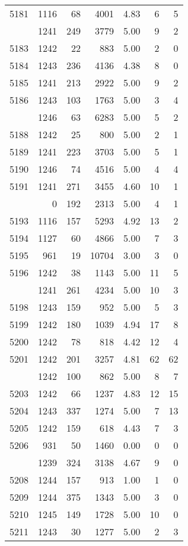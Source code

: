 \documentclass[
]{article}
\begin{document}
\begin{table}
\begin{tabular}[t]{lrrrrrr}
5181 & 1116 & 68 & 4001 & 4.83 & 6 & 5\\
\addlinespace
5182 & 1241 & 249 & 3779 & 5.00 & 9 & 2\\
5183 & 1242 & 22 & 883 & 5.00 & 2 & 0\\
5184 & 1243 & 236 & 4136 & 4.38 & 8 & 0\\
5185 & 1241 & 213 & 2922 & 5.00 & 9 & 2\\
5186 & 1243 & 103 & 1763 & 5.00 & 3 & 4\\
\addlinespace
5187 & 1246 & 63 & 6283 & 5.00 & 5 & 2\\
5188 & 1242 & 25 & 800 & 5.00 & 2 & 1\\
5189 & 1241 & 223 & 3703 & 5.00 & 5 & 1\\
5190 & 1246 & 74 & 4516 & 5.00 & 4 & 4\\
5191 & 1241 & 271 & 3455 & 4.60 & 10 & 1\\
\addlinespace
5192 & 0 & 192 & 2313 & 5.00 & 4 & 1\\
5193 & 1116 & 157 & 5293 & 4.92 & 13 & 2\\
5194 & 1127 & 60 & 4866 & 5.00 & 7 & 3\\
5195 & 961 & 19 & 10704 & 3.00 & 3 & 0\\
5196 & 1242 & 38 & 1143 & 5.00 & 11 & 5\\
\addlinespace
5197 & 1241 & 261 & 4234 & 5.00 & 10 & 3\\
5198 & 1243 & 159 & 952 & 5.00 & 5 & 3\\
5199 & 1242 & 180 & 1039 & 4.94 & 17 & 8\\
5200 & 1242 & 78 & 818 & 4.42 & 12 & 4\\
5201 & 1242 & 201 & 3257 & 4.81 & 62 & 62\\
\addlinespace
5202 & 1242 & 100 & 862 & 5.00 & 8 & 7\\
5203 & 1242 & 66 & 1237 & 4.83 & 12 & 15\\
5204 & 1243 & 337 & 1274 & 5.00 & 7 & 13\\
5205 & 1242 & 159 & 618 & 4.43 & 7 & 3\\
5206 & 931 & 50 & 1460 & 0.00 & 0 & 0\\
\addlinespace
5207 & 1239 & 324 & 3138 & 4.67 & 9 & 0\\
5208 & 1244 & 157 & 913 & 1.00 & 1 & 0\\
5209 & 1244 & 375 & 1343 & 5.00 & 3 & 0\\
5210 & 1245 & 149 & 1728 & 5.00 & 10 & 0\\
5211 & 1243 & 30 & 1277 & 5.00 & 2 & 3\\

\end{tabular}
\end{table}
\end{document}

